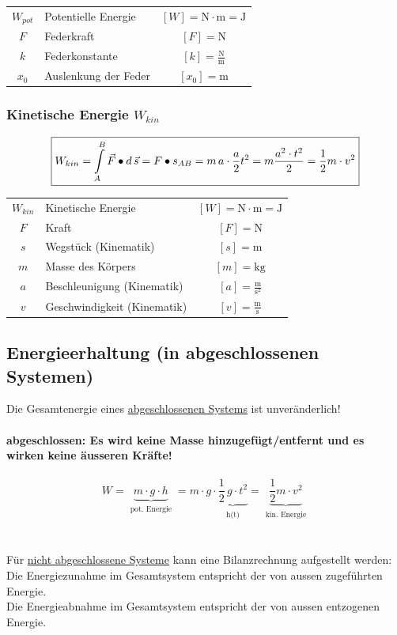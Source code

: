 	
	\begin{tabular}{c l c}
	$W_{pot}$ & Potentielle Energie & $[W] = \mathrm{N \cdot m = J}$ \\
	$F$ & Federkraft & $[F] = \mathrm{N} $ \\
	$k$ & Federkonstante & $[k] = \mathrm{\frac{N}{m}}$ \\
	$x_0$ & Auslenkung der Feder & $[x_0] = \mathrm{m}$ \\
	\end{tabular}
	
	\vfill\null
	\columnbreak
	
	
	
	\subsubsection{Kinetische Energie $W_{kin}$}
	
	$$ \boxed{ \normalsize{ W_{kin} = \int \limits_A^B \vec{F} \bullet d \, \vec{s} =  F \bullet s_{AB} = m \, a \cdot \frac{a}{2} t^2 = m \frac{a^2 \cdot t^2}{2} = \frac{1}{2} m \cdot v^2} }$$
	
	
	\begin{tabular}{c l c}
	$W_{kin}$ & Kinetische Energie & $[W] = \mathrm{N \cdot m = J}$ \\
	$F$ & Kraft & $[F] = \mathrm{N} $ \\
	$s$ & Wegstück (Kinematik) & $[s] = \mathrm{m}$ \\
	$m$ & Masse des Körpers & $[m] = \mathrm{kg}$ \\
	$a$ & Beschleunigung (Kinematik) & $[a] = \mathrm{\frac{m}{s^2}}$ \\
	$v$ & Geschwindigkeit (Kinematik) & $[v] = \mathrm{\frac{m}{s}}$ \\
	\end{tabular}
	
	
	
	\subsection{Energieerhaltung (in abgeschlossenen Systemen)}
	
	Die Gesamtenergie eines \underline{abgeschlossenen Systems} ist unveränderlich! \\
	\\
	\textbf{abgeschlossen: Es wird keine Masse hinzugefügt/entfernt und es wirken keine äusseren Kräfte!} \\
	\\	
	$$ \boxed{ W = \underbrace{m \cdot g \cdot h}_{\substack{\text{pot. Energie}}} =  m \cdot g \cdot \underbrace{ \frac{1}{2} \, g \cdot t^2}_{\substack{\text{h(t)}}}  = \underbrace{ \frac{1}{2} m \cdot v^2 }_{\substack{\text{kin. Energie}}} } $$ \\
	\\
	Für \underline{nicht abgeschlossene Systeme} kann eine Bilanzrechnung aufgestellt werden: \\
	Die Energiezunahme im Gesamtsystem entspricht der von aussen zugeführten Energie. \\
	Die Energieabnahme im Gesamtsystem entspricht der von aussen entzogenen Energie. \\
	
